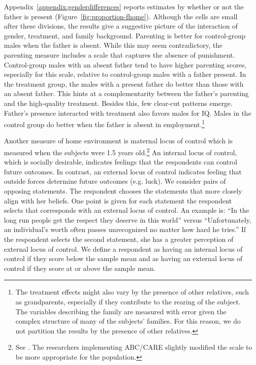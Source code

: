 Appendix~\ref{appendix:genderdifferences} reports estimates by whether or not the father is present (Figure~\ref{fig:proportion-fhome}). Although the cells are small after these divisions, the results give a suggestive picture of the interaction of gender, treatment, and family background. Parenting is better for control-group males when the father is absent. While this may seem contradictory, the parenting measure includes a scale that captures the absence of punishment. Control-group males with an absent father tend to have higher parenting scores, especially for this scale, relative to control-group males with a father present. In the treatment group, the males with a present father do better than those with an absent father. This hints at a complementarity between the father's parenting and the high-quality treatment. Besides this, few clear-cut patterns emerge. Father's presence interacted with treatment also favors males for IQ. Males in the control group do better when the father is absent in employment.\footnote{The treatment effects might also vary by the presence of other relatives, such as grandparents, especially if they contribute to the rearing of the subject. The variables describing the family are measured with error given the complex structure of many of the subjects' families. For this reason, we do not partition the results by the presence of other relatives.}

Another measure of home environment is maternal locus of control which is measured when the subjects were 1.5 years old.\footnote{See \citet{Rotter_1966_PMGaA}. The researchers implementing ABC/CARE slightly modified the scale to be more appropriate for the population.} An internal locus of control, which is socially desirable, indicates feelings that the respondents can control future outcomes. In contrast, an external locus of control indicates feeling that outside forces determine future outcomes (e.g. luck). We consider pairs of opposing statements. The respondent chooses the statements that more closely align with her beliefs. One point is given for each statement the respondent selects that corresponds with an external locus of control. An example is: ``In the long run people get the respect they deserve in this world'' versus ``Unfortunately, an individual's worth often passes unrecognized no matter how hard he tries.'' If the respondent selects the second statement, she has a greater perception of external locus of control.  We define a respondent as having an internal locus of control if they score below the sample mean and as having an external locus of control if they score at or above the sample mean.

